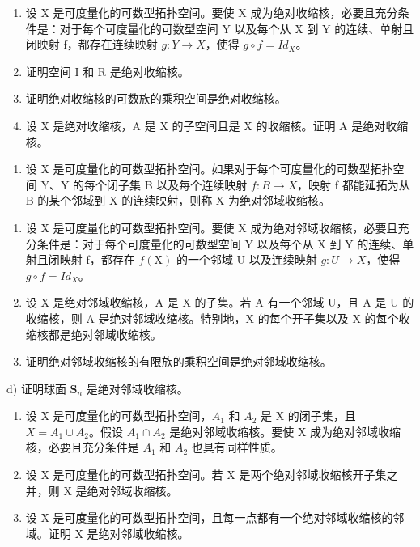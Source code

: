 \begin{enumerate}
\def\labelenumi{\alph{enumi})}
\item
  设 X 是可度量化的可数型拓扑空间。要使 X 成为绝对收缩核，必要且充分条件是：对于每个可度量化的可数型空间 Y 以及每个从 X 到 Y 的连续、单射且闭映射 f，都存在连续映射 \(g: Y \to X\)，使得 \(g \circ f = Id_{X}\)。
\item
  证明空间 I 和 R 是绝对收缩核。
\item
  证明绝对收缩核的可数族的乘积空间是绝对收缩核。
\item
  设 X 是绝对收缩核，A 是 X 的子空间且是 X 的收缩核。证明 A 是绝对收缩核。
\end{enumerate}

\begin{enumerate}
\def\labelenumi{\arabic{enumi})}
\setcounter{enumi}{6}
\tightlist
\item
  设 X 是可度量化的可数型拓扑空间。如果对于每个可度量化的可数型拓扑空间 Y、Y 的每个闭子集 B 以及每个连续映射 \(f: B \rightarrow X\)，映射 f 都能延拓为从 B 的某个邻域到 X 的连续映射，则称 X 为绝对邻域收缩核。
\end{enumerate}

\begin{enumerate}
\def\labelenumi{\alph{enumi})}
\item
  设 X 是可度量化的可数型拓扑空间。要使 X 成为绝对邻域收缩核，必要且充分条件是：对于每个可度量化的可数型空间 Y 以及每个从 X 到 Y 的连续、单射且闭映射 f，都存在 \(f(\mathrm{X})\) 的一个邻域 U 以及连续映射 \(g: U \to X\)，使得 \(g \circ f = Id_{X}\)。
\item
  设 X 是绝对邻域收缩核，A 是 X 的子集。若 A 有一个邻域 U，且 A 是 U 的收缩核，则 A 是绝对邻域收缩核。特别地，X 的每个开子集以及 X 的每个收缩核都是绝对邻域收缩核。
\item
  证明绝对邻域收缩核的有限族的乘积空间是绝对邻域收缩核。
\end{enumerate}

d) 证明球面 \(\mathbf{S}_n\) 是绝对邻域收缩核。

\begin{enumerate}
\def\labelenumi{\alph{enumi})}
\setcounter{enumi}{4}
\item
  设 X 是可度量化的可数型拓扑空间，\(A_{1}\) 和 \(A_{2}\) 是 X 的闭子集，且 \(X = A_{1} \cup A_{2}\)。假设 \(A_{1} \cap A_{2}\) 是绝对邻域收缩核。要使 X 成为绝对邻域收缩核，必要且充分条件是 \(A_{1}\) 和 \(A_{2}\) 也具有同样性质。
\item
  设 X 是可度量化的可数型拓扑空间。若 X 是两个绝对邻域收缩核开子集之并，则 X 是绝对邻域收缩核。
\item
  设 X 是可度量化的可数型拓扑空间，且每一点都有一个绝对邻域收缩核的邻域。证明 X 是绝对邻域收缩核。
\end{enumerate}

